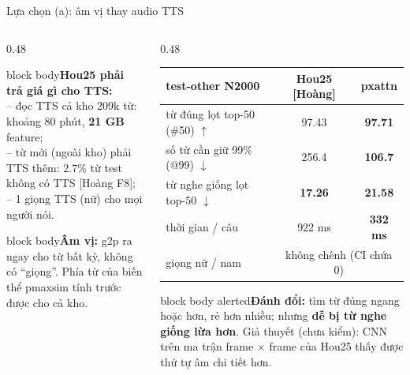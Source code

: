 \documentclass[aspectratio=169,xcolor=table]{beamer}
\newcommand{\bad}[1]{\textcolor{RiskRed}{\textbf{#1}}}
\newcommand{\good}[1]{\textcolor{GoodGreen}{\textbf{#1}}}
\newcommand{\src}[1]{{\tiny\color{TextGray}[#1]}}
\newcommand{\nbox}[2][block body]{\begin{beamercolorbox}[sep=0.45em,rounded=true]{#1}\footnotesize #2\end{beamercolorbox}}
\begin{document}
\begin{frame}{Lựa chọn (a): âm vị thay audio TTS}
\begin{columns}[T]
\begin{column}{0.48\textwidth}
\nbox{\textbf{Hou25 phải trả giá gì cho TTS:}\\
-- đọc TTS cả kho 209k từ: khoảng 80 phút, \textbf{21 GB} feature;\\
-- từ mới (ngoài kho) phải TTS thêm: 2.7\% từ test không có TTS \src{Hoàng F8};\\
-- 1 giọng TTS (nữ) cho mọi người nói.}
\vspace{0.12cm}
\nbox{\textbf{Âm vị:} g2p ra ngay cho từ bất kỳ, không có ``giọng''. Phía từ của biến thể pmaxsim tính trước được cho cả kho.}
\end{column}
\begin{column}{0.48\textwidth}
\centering\scriptsize\setlength{\tabcolsep}{3pt}
\begin{tabular}{lcc}
\toprule
test-other N2000 & Hou25 \src{Hoàng} & pxattn\\
\midrule
từ đúng lọt top-50 (\#50) $\uparrow$ & 97.43 & \good{97.71}\\
số từ cần giữ 99\% (@99) $\downarrow$ & 256.4 & \good{106.7}\\
từ nghe giống lọt top-50 $\downarrow$ & \good{17.26} & \bad{21.58}\\
thời gian / câu & 922 ms & \good{332 ms}\\
giọng nữ / nam & \multicolumn{2}{c}{không chênh (CI chứa 0)}\\
\bottomrule
\end{tabular}\par
\vspace{0.15cm}\raggedright
\nbox[block body alerted]{\textbf{Đánh đổi:} tìm từ đúng ngang hoặc hơn, rẻ hơn nhiều; nhưng \bad{dễ bị từ nghe giống lừa hơn}. Giả thuyết (chưa kiểm): CNN trên ma trận frame $\times$ frame của Hou25 thấy được thứ tự âm chi tiết hơn.}
\end{column}
\end{columns}
\end{frame}
\end{document}
